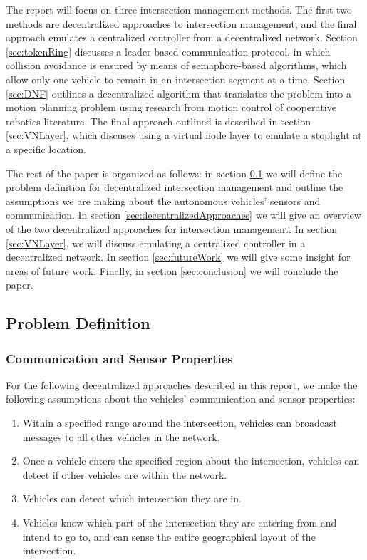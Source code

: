 \documentclass[12pt]{article}
\begin{document}
The report will focus on three intersection management methods.  The first two methods are decentralized approaches to intersection management, and the final approach emulates a centralized controller from a decentralized network.  Section \ref{sec:tokenRing}  discusses a leader based communication protocol, in which  collision avoidance is ensured by means of semaphore-based algorithms, which allow only one vehicle to remain in an intersection segment at a time.  Section \ref{sec:DNF} outlines a decentralized algorithm that translates the problem into a motion planning problem using research from motion control of cooperative robotics literature.  The final approach outlined is described in section \ref{sec:VNLayer}, which discuses using a virtual node layer to emulate a stoplight at a specific location. 
 
The rest of the  paper is organized as follows: in section \ref{sec:problemDefinition} we will define the problem definition for decentralized intersection management and outline the assumptions we are making about the autonomous vehicles' sensors and communication.  In section \ref{sec:decentralizedApproaches} we will give an overview of the two decentralized approaches for intersection management.  In section \ref{sec:VNLayer}, we will discuss emulating a centralized controller in a decentralized network.  In section \ref{sec:futureWork} we will give some insight for areas of future work.  Finally, in section \ref{sec:conclusion} we will conclude the paper.

\subsection{Problem Definition}
\label{sec:problemDefinition}
\subsubsection{Communication and Sensor Properties}
For the following decentralized approaches described in this report, we make the following assumptions about the vehicles' communication and sensor properties:
\begin{enumerate}
\item Within a specified range around the intersection, vehicles can broadcast messages to all other vehicles in the network. %
\item
Once a vehicle enters the specified region about the intersection, vehicles can detect if other vehicles are within the network. 
\item
Vehicles can detect which intersection they are in.
\item
Vehicles know which part of the intersection they are entering from and intend to go to, and can sense the entire geographical layout of the intersection.
\end{enumerate}
\end{document}
